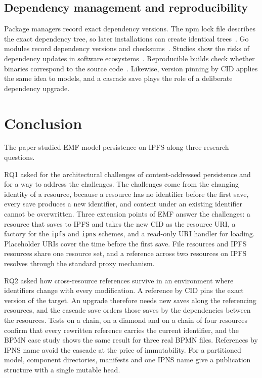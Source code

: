 \documentclass[iicol,pdflatex,sn-mathphys-num]{sn-jnl}
\theoremstyle{thmstylethree}%
\begin{document}
\subsection{Dependency management and reproducibility}\label{sec:related-dependencies}

Package managers record exact dependency versions. The npm lock file describes the exact dependency tree, so later installations can create identical trees~\cite{npmpackagelock}. Go modules record dependency versions and checksums~\cite{gomodules}. Studies show the risks of dependency updates in software ecosystems~\cite{cox2019dependencies,decan2019ecosystems}. Reproducible builds check whether binaries correspond to the source code~\cite{lamb2022reproducible}. Likewise, version pinning by CID applies the same idea to models, and a cascade save plays the role of a deliberate dependency upgrade.

\section{Conclusion}\label{sec:conclusion}

The paper studied EMF model persistence on IPFS along three research questions.

RQ1 asked for the architectural challenges of content-addressed persistence and for a way to address the challenges. The challenges come from the changing identity of a resource, because a resource has no identifier before the first save, every save produces a new identifier, and content under an existing identifier cannot be overwritten. Three extension points of EMF answer the challenges: a resource that saves to IPFS and takes the new CID as the resource URI, a factory for the \texttt{ipfs} and \texttt{ipns} schemes, and a read-only URI handler for loading. Placeholder URIs cover the time before the first save. File resources and IPFS resources share one resource set, and a reference across two resources on IPFS resolves through the standard proxy mechanism.

RQ2 asked how cross-resource references survive in an environment where identifiers change with every modification. A reference by CID pins the exact version of the target. An upgrade therefore needs new saves along the referencing resources, and the cascade save orders those saves by the dependencies between the resources. Tests on a chain, on a diamond and on a chain of four resources confirm that every rewritten reference carries the current identifier, and the BPMN case study shows the same result for three real BPMN files. References by IPNS name avoid the cascade at the price of immutability. For a partitioned model, component directories, manifests and one IPNS name give a publication structure with a single mutable head.
\end{document}
